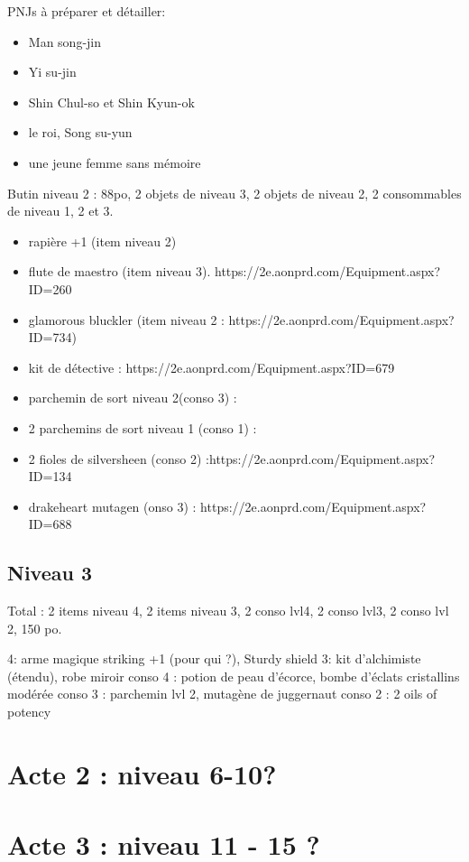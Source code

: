\documentclass[10pt,a4paper]{book}
\begin{document}
PNJs à préparer et détailler:
\begin{itemize}
\item Man song-jin
\item Yi su-jin
\item Shin Chul-so et Shin Kyun-ok
\item le roi, Song su-yun
\item une jeune femme sans mémoire
\end{itemize}

Butin niveau 2 : 88po, 2 objets de niveau 3, 2 objets de niveau 2, 2 consommables de niveau 1, 2 et 3. 
\begin{itemize}
\item rapière +1 (item niveau 2)
\item flute de maestro (item niveau 3). https://2e.aonprd.com/Equipment.aspx?ID=260
\item glamorous bluckler (item niveau 2 : https://2e.aonprd.com/Equipment.aspx?ID=734)
\item kit de détective : https://2e.aonprd.com/Equipment.aspx?ID=679
\item parchemin de sort niveau 2(conso 3) :
\item 2 parchemins de sort niveau 1 (conso 1) :
\item 2 fioles de silversheen (conso 2) :https://2e.aonprd.com/Equipment.aspx?ID=134
\item drakeheart mutagen (onso 3) : https://2e.aonprd.com/Equipment.aspx?ID=688
\end{itemize}

\subsection{Niveau 3}
Total : 2 items niveau 4, 2 items niveau 3, 2 conso lvl4, 2 conso lvl3, 2 conso lvl 2, 150 po.

4: arme magique striking +1 (pour qui ?), Sturdy shield
3: kit d'alchimiste (étendu), robe miroir 
conso 4 : potion de peau d'écorce, bombe d'éclats cristallins modérée
conso 3 : parchemin lvl 2, mutagène de juggernaut
conso 2 : 2 oils of potency
\section{Acte 2 : niveau 6-10?}

\section{Acte 3 : niveau 11 - 15 ?}
\end{document}
